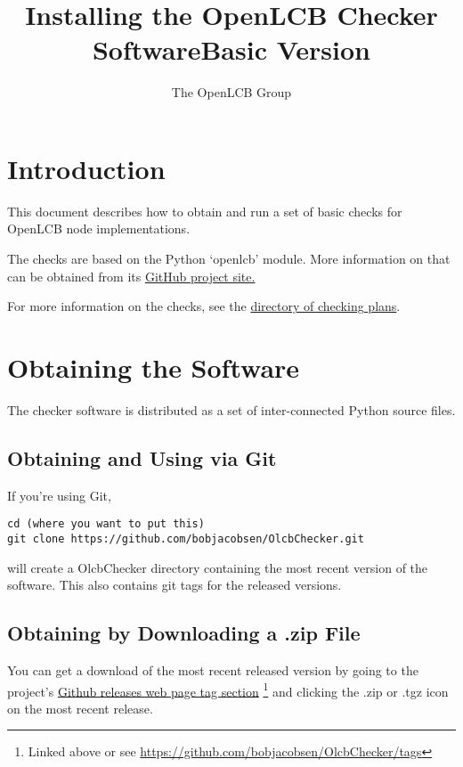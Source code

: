 \documentclass[11pt]{article}
\title{Installing the OpenLCB Checker Software\linebreak{}Basic Version}
\author{The OpenLCB Group}
\begin{document}
\maketitle


\section{Introduction}

This document describes how to obtain and run a set of basic checks for 
OpenLCB node implementations.  

The checks are based on the Python `openlcb' module.
More information on that can be obtained from its
\href{https://github.com/bobjacobsen/PythonOlcbNode}{GitHub project site.}

For more information on the checks, see the
\href{https://github.com/bobjacobsen/OlcbChecker/tree/main/plans/}{directory of checking plans}.

\section{Obtaining the Software}

The checker software is distributed as a set of inter-connected Python source files.

\subsection{Obtaining and Using via Git}

If you're using Git, 
\begin{verbatim}
cd (where you want to put this)
git clone https://github.com/bobjacobsen/OlcbChecker.git
\end{verbatim}
will create a OlcbChecker directory containing the most recent version of the software.
This also contains git tags for the released versions.

\subsection{Obtaining by Downloading a .zip File}

You can get a download of the most recent released version by going to the project's 
\href{https://github.com/bobjacobsen/OlcbChecker/tags}{Github releases web page tag section}
\footnote{Linked above or see \href{https://github.com/bobjacobsen/OlcbChecker/tags}{https://github.com/bobjacobsen/OlcbChecker/tags}}
and clicking the .zip or .tgz icon on the most recent release.
\end{document}
